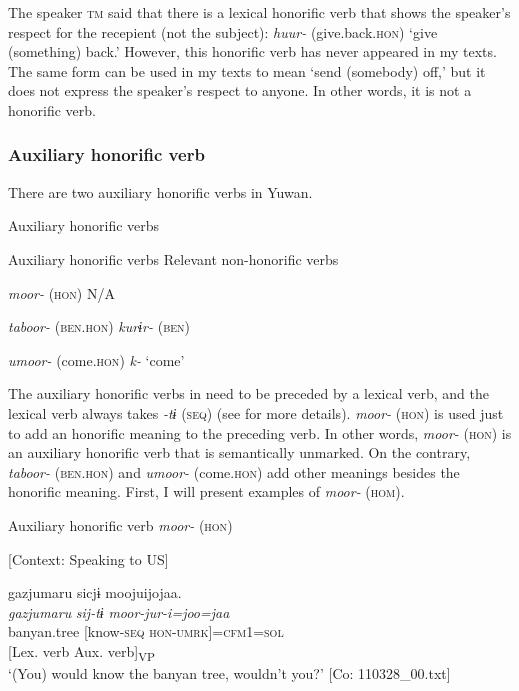   The speaker \textsc{tm} said that there is a lexical honorific verb that shows the speaker’s respect for the recepient (not the subject): \textit{huur-} (give.back.\textsc{hon}) ‘give (something) back.’ However, this honorific verb has never appeared in my texts. The same form can be used in my texts to mean ‘send (somebody) off,’ but it does not express the speaker’s respect to anyone. In other words, it is not a honorific verb.

\subsubsection{Auxiliary honorific verb}

There are two auxiliary honorific verbs in Yuwan.

\begin{table}
\caption{\label{tab:key:73}}\textmd{ Auxiliary honorific verbs}

Auxiliary honorific verbs  Relevant non-honorific verbs

\textit{moor-} (\textsc{hon})  N/A

\textit{taboor-} (\textsc{ben}.\textsc{hon})  \textit{kurɨr-} (\textsc{ben})

\textit{umoor-} (come.\textsc{hon})  \textit{k-} ‘come’
\end{table}

The auxiliary honorific verbs in  need to be preceded by a lexical verb, and the lexical verb always takes \textit{-tɨ} (\textsc{seq}) (see  for more details). \textit{moor-} (\textsc{hon}) is used just to add an honorific meaning to the preceding verb. In other words, \textit{moor-} (\textsc{hon}) is an auxiliary honorific verb that is semantically unmarked. On the contrary, \textit{taboor-} (\textsc{ben}.\textsc{hon}) and \textit{umoor-} (come.\textsc{hon}) add other meanings besides the honorific meaning. First, I will present examples of \textit{moor-} (\textsc{hom}).

\ea\label{ex:8-25}
  Auxiliary honorific verb \textit{moor-} (\textsc{hon})

\ea{} [Context: Speaking to US]

{\TM}
\gllll  gazjumaru  sicjɨ  moojuijojaa.\\
\textit{gazjumaru}  \textit{sij-tɨ}  \textit{moor-jur-i=joo=jaa}\\
banyan.tree  [know-\textsc{seq}  \textsc{hon}-\textsc{umrk}]=\textsc{cfm1}=\textsc{sol}\\
        {}[Lex. verb  Aux. verb]\textsubscript{VP}\\
\glt ‘(You) would know the banyan tree, wouldn’t you?’ [Co: 110328\_00.txt]

